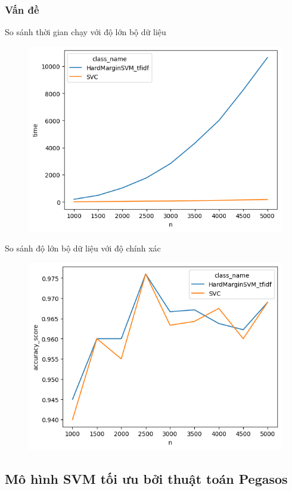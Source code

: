 \documentclass[serif, aspectratio=169]{beamer}
\begin{document}
	\subsubsection{Vấn đề}
	\begin{frame}{So sánh thời gian chạy với độ lớn bộ dữ liệu}
		\begin{figure}
			\centering
			\includegraphics[width=0.6\linewidth]{pic/n-time-hardmargin-svm.png}
			\label{fig:n-time-hardmargin-svm}
		\end{figure}
	\end{frame}
	
	\begin{frame}{So sánh độ lớn bộ dữ liệu với độ chính xác}
		\begin{figure}
			\centering
			\includegraphics[width=0.6\linewidth]{pic/n-acc-hardmargin-svm.png}
			\label{fig:n-acc-hardmargin-svm}
		\end{figure}
	\end{frame}
	
	\subsection{Mô hình SVM tối ưu bởi thuật toán Pegasos}
\end{document}
